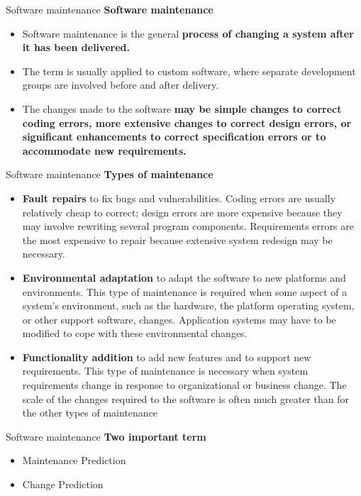 \documentclass{beamer}
\begin{document}
\begin{frame}{Software maintenance}
\textbf{Software maintenance}
\begin{itemize}
	\item Software maintenance is the general \textbf{process of changing a system after it has been delivered. }
	\item The term is usually applied to custom software, where separate development groups are involved 
	before and after delivery.
	\item The changes made to the software \textbf{may be simple changes to correct coding errors, more extensive 
		changes to correct design errors, or significant enhancements to correct specification errors or to 
		accommodate new requirements.}

\end{itemize}
\end{frame}
\begin{frame}{Software maintenance}
	\textbf{Types of maintenance}
	\begin{itemize}
		\item \textbf{Fault repairs} to fix bugs and vulnerabilities. Coding errors are usually relatively cheap to correct; design 
		errors are more expensive because they may involve rewriting several program components. 
		Requirements errors are the most expensive to repair because extensive system redesign may be 
		necessary.
		\item \textbf{Environmental adaptation} to adapt the software to new platforms and environments. This type of 
		maintenance is required when some aspect of a system’s environment, such as the hardware, the 
		platform operating system, or other support software, changes. Application systems may have to be 
		modified to cope with these environmental changes.
		\item \textbf{Functionality addition} to add new features and to support new requirements. This type of maintenance 
		is necessary when system requirements change in response to organizational or business change. The 
		scale of the changes required to the software is often much greater than for the other types of 
		maintenance
	\end{itemize}
\end{frame}
\begin{frame}{Software maintenance}
	\textbf{Two important term}
	\begin{itemize}
		\item Maintenance Prediction
		\item Change Prediction
	\end{itemize}
\end{frame}
\end{document}
